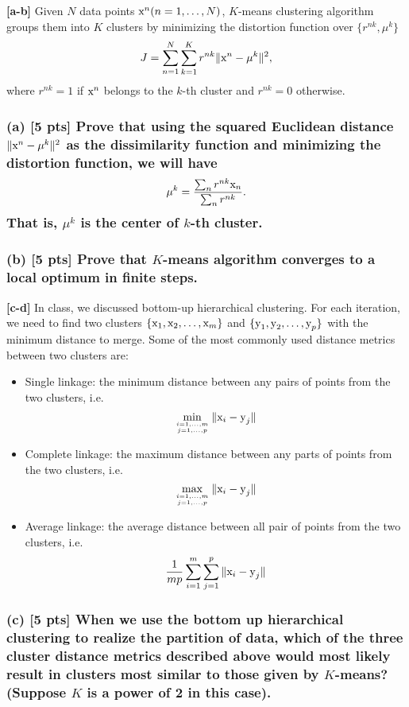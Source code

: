 \documentclass[twoside,10pt]{article}
\begin{document}
\textbf{[a-b]} Given $N$ data points $\text x^n (n=1,\dots,N)$, $K$-means clustering algorithm groups them into $K$ clusters by minimizing the distortion function over $\{ r^{nk}, \mu^k \}$
$$J=\sum_{n=1}^N\sum_{k=1}^Kr^{nk} \|\text x^n-\mu^k\|^2,$$
where $r^{nk}=1$ if $\text x^n$ belongs to the $k$-th cluster and $r^{nk}=0$ otherwise.

\subsubsection*{(a) [5 pts] Prove that using the squared Euclidean distance $\|\text x^n-\mu^k\|^2$ as the dissimilarity function and minimizing the distortion function, we will have 
   $$\mu^k=\frac{\sum_n r^{nk} \text x_n}{\sum_n r^{nk}}.$$
   That is, $\mu^k$ is the center of $k$-th cluster.}

\subsubsection*{(b) [5 pts] Prove that $K$-means algorithm converges to a local optimum in finite steps.}


\textbf{[c-d]} In class, we discussed bottom-up hierarchical clustering. For each iteration, we need to find two clusters $\{\text x_1, \text x_2, \dots, \text x_m\}$ and $\{\text y_1, \text y_2, \dots, \text y_p\}$ with the minimum distance to merge. Some of the most commonly used distance metrics between two clusters are:
    \begin{itemize}
    \item Single linkage: the minimum distance between any pairs of points from the two clusters, i.e.
    $$\min_{i=1,\dots,m \atop j=1,\dots, p}\|\text x_i - \text y_j\|$$
    \item Complete linkage: the maximum distance between any parts of points from the two clusters, i.e.
    $$\max_{i=1,\dots,m \atop j=1,\dots, p}\|\text x_i - \text y_j\|$$
    \item Average linkage: the average distance between all pair of points from the two clusters, i.e.
    $$\frac{1}{mp}\sum_{i=1}^m\sum_{j=1}^p\|\text x_i - \text y_j\|$$
    \end{itemize}

\subsubsection*{(c) [5 pts] When we use the bottom up hierarchical clustering to realize the partition of data, which of the three cluster distance metrics described above would most likely result in clusters most similar to those given by $K$-means? (Suppose $K$ is a power of 2 in this case).}
\end{document}
